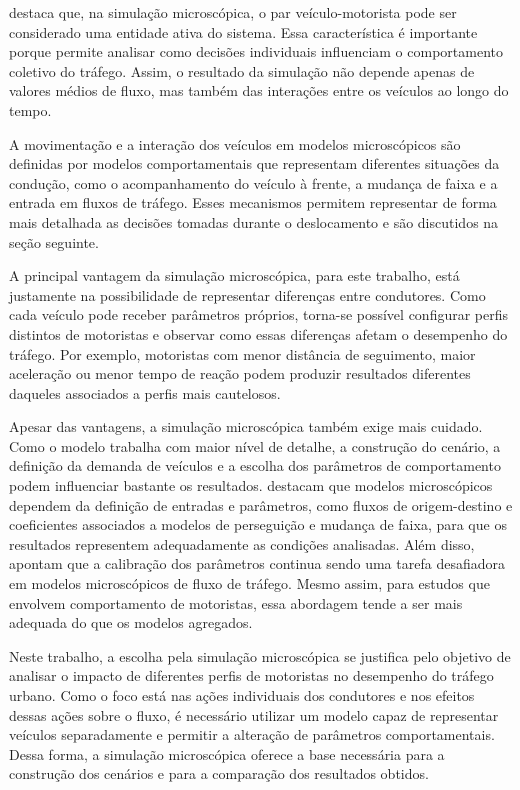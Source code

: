  destaca que, na simulação microscópica, o par veículo-motorista pode ser considerado uma entidade ativa do sistema. Essa característica é importante porque permite analisar como decisões individuais influenciam o comportamento coletivo do tráfego. Assim, o resultado da simulação não depende apenas de valores médios de fluxo, mas também das interações entre os veículos ao longo do tempo.

A movimentação e a interação dos veículos em modelos microscópicos são definidas por modelos comportamentais que representam diferentes situações da condução, como o acompanhamento do veículo à frente, a mudança de faixa e a entrada em fluxos de tráfego. Esses mecanismos permitem representar de forma mais detalhada as decisões tomadas durante o deslocamento e são discutidos na seção seguinte.

A principal vantagem da simulação microscópica, para este trabalho, está justamente na possibilidade de representar diferenças entre condutores. Como cada veículo pode receber parâmetros próprios, torna-se possível configurar perfis distintos de motoristas e observar como essas diferenças afetam o desempenho do tráfego. Por exemplo, motoristas com menor distância de seguimento, maior aceleração ou menor tempo de reação podem produzir resultados diferentes daqueles associados a perfis mais cautelosos.

Apesar das vantagens, a simulação microscópica também exige mais cuidado. Como o modelo trabalha com maior nível de detalhe, a construção do cenário, a definição da demanda de veículos e a escolha dos parâmetros de comportamento podem influenciar bastante os resultados.  destacam que modelos microscópicos dependem da definição de entradas e parâmetros, como fluxos de origem-destino e coeficientes associados a modelos de perseguição e mudança de faixa, para que os resultados representem adequadamente as condições analisadas. Além disso,  apontam que a calibração dos parâmetros continua sendo uma tarefa desafiadora em modelos microscópicos de fluxo de tráfego. Mesmo assim, para estudos que envolvem comportamento de motoristas, essa abordagem tende a ser mais adequada do que os modelos agregados.

Neste trabalho, a escolha pela simulação microscópica se justifica pelo objetivo de analisar o impacto de diferentes perfis de motoristas no desempenho do tráfego urbano. Como o foco está nas ações individuais dos condutores e nos efeitos dessas ações sobre o fluxo, é necessário utilizar um modelo capaz de representar veículos separadamente e permitir a alteração de parâmetros comportamentais. Dessa forma, a simulação microscópica oferece a base necessária para a construção dos cenários e para a comparação dos resultados obtidos.

